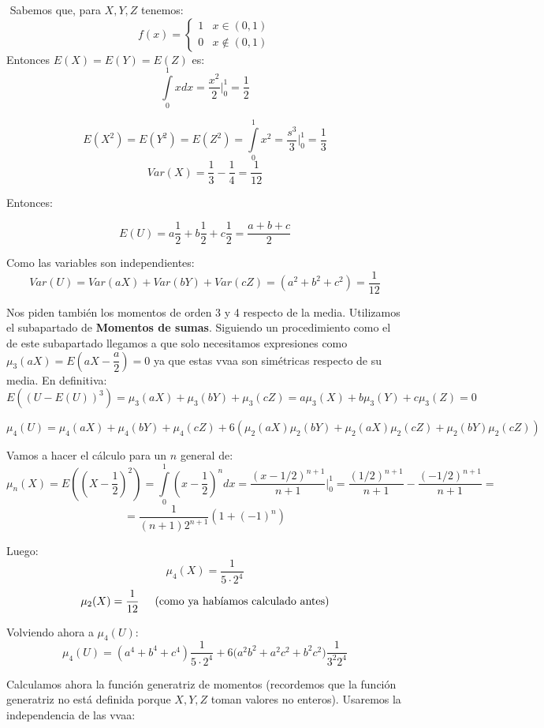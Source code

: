 \documentclass[openany]{book}
\begin{document}
\setcounter{ex}{2}
\begin{exercise}
    $  $
    Sabemos que, para $ X,Y,Z $ tenemos:
    $$ f(x)=
    \left\{
    \begin{array}{lr}
        1 & x \in (0,1)\\
        0 & x \not \in (0,1)
    \end{array}
    \right.
    $$
    Entonces $ E(X)=E(Y)=E(Z)  $ es:
    $$ \int\limits_{0}^{1} xdx = \dfrac{x^2}{2} \Biggr|_{0}^{1} = \dfrac{1}{2} $$

    $$ E(X^2) = E(Y^2) = E(Z^2) = \int\limits_{0}^{1} x ^2 = \dfrac{s^3}{3} \Biggr|_{0}^{1} = \dfrac{1}{3}$$
    $$ Var(X)=\dfrac{1}{3}-\dfrac{1}{4} = \dfrac{1}{12} $$

    Entonces:

    $$ E(U) = a \dfrac{1}{2}+b \dfrac{1}{2} +c \dfrac{1}{2} = \dfrac{a+b+c}{2} $$
    
    Como las variables son independientes:
    $$ Var(U) = Var(aX)+Var(bY) + Var(cZ) = (a^2+b^2+c^2) = \dfrac{1}{12} $$

    Nos piden también los momentos de orden 3 y 4 respecto de la media. Utilizamos el subapartado de \textbf{Momentos de sumas}. Siguiendo un procedimiento como el de este subapartado llegamos a que solo necesitamos expresiones como $ \mu_{3}(aX) = E\left(aX-\dfrac{a}{2}\right) = 0 $ ya que estas vvaa son simétricas respecto de su media. En definitiva:
    $$ E((U-E(U))^3) = \mu_{3}(aX)+\mu_{3}(bY)+\mu_{3}(cZ) = a \mu_{3}(X) + b \mu_{3}(Y) + c\mu_{3}(Z) = 0 $$

    $$ \mu_{4}(U) = \mu_{4}(aX) + \mu_{4}(bY) + \mu_{4}(cZ) + 6(\mu_{2}(aX)\mu_{2}(bY)+\mu_{2}(aX)\mu_{2}(cZ) + \mu_{2}(bY)\mu_{2}(cZ)) $$
    
    Vamos a hacer el cálculo para un $ n $ general de:
    $$ \mu_{n}(X) = E\left( \left( X-\dfrac{1}{2}   \right)^2\right) = \int\limits_{0}^{1} \left( x-\dfrac{1}{2} \right) ^{n} dx = \dfrac{(x-1/2)^{n+1}}{n+1} \Biggr|_{0}^{1} = \dfrac{(1/2)^{n+1}}{n+1}-\dfrac{(-1/2)^{n+1}}{n+1} =$$
    $$ = \dfrac{1}{(n+1)2^{n+1}} (1+(-1)^{n}) $$

    Luego:
    $$ \mu_{4}(X) = \dfrac{1}{5\cdot 2^{4}} $$
    $$ \mu_{2}(X) = \dfrac{1}{12} \hspace{5mm} \text{(como ya habíamos calculado antes)} $$

    Volviendo ahora a $ \mu_{4}(U) $:
    $$ \mu_{4}(U) =  (a^{4}+b^{4}+c^{4})\dfrac{1}{5\cdot 2^{4}} + 6 \Big(a^2b^2+a^2c^2+b^2c^2 \Big ) \dfrac{1}{3^2 2^{4}}$$

    Calculamos ahora la función generatriz de momentos (recordemos que la función generatriz no está definida porque $ X,Y,Z $ toman valores no enteros). Usaremos la independencia de las vvaa:


\end{exercise}
\end{document}
